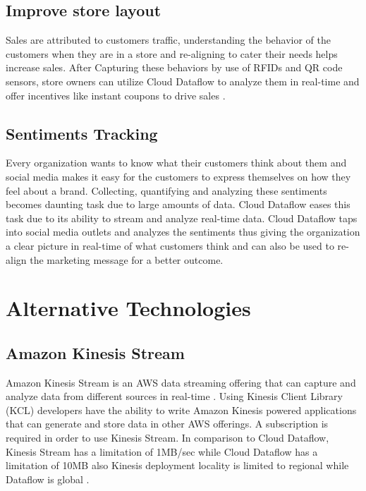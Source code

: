 \documentclass[9pt,twocolumn,twoside]{styles/osajnl}
\begin{document}
\subsection{Improve store layout}

Sales are attributed to customers traffic, understanding the behavior
of the customers when they are in a store and re-aligning to cater
their needs helps increase sales. After Capturing these behaviors by
use of RFIDs and QR code sensors, store owners can utilize Cloud
Dataflow to analyze them in real-time and offer incentives like
instant coupons to drive sales \cite{www-storelayout}.

\subsection{Sentiments Tracking}

Every organization wants to know what their customers think about them
and social media makes it easy for the customers to express themselves
on how they feel about a brand. Collecting, quantifying and analyzing
these sentiments becomes daunting task due to large amounts of
data. Cloud Dataflow eases this task due to its ability to stream and
analyze real-time data. Cloud Dataflow taps into social media outlets
and analyzes the sentiments thus giving the organization a clear
picture in real-time of what customers think and can also be used to
re-align the marketing message for a better outcome.

\section{Alternative Technologies}

\subsection{Amazon Kinesis Stream}

Amazon Kinesis Stream is an AWS data streaming offering that can
capture and analyze data from different sources in real-time
\cite{www-kinesis}. Using Kinesis Client Library (KCL) developers have
the ability to write Amazon Kinesis powered applications that can
generate and store data in other AWS offerings. A subscription is
required in order to use Kinesis Stream. In comparison to Cloud
Dataflow, Kinesis Stream has a limitation of 1MB/sec while Cloud
Dataflow has a limitation of 10MB also Kinesis deployment locality is
limited to regional while Dataflow is global \cite{www-awscomparison}.
\end{document}

